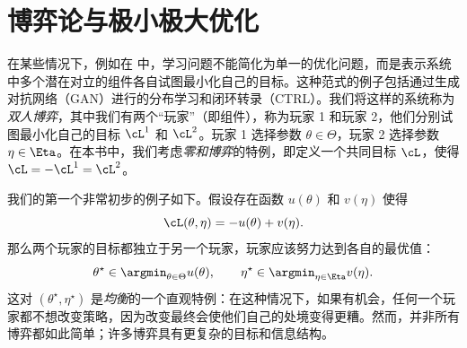 \documentclass[../../book-main_zh.tex]{subfiles}
\begin{document}
\section{博弈论与极小极大优化}
\label{sec:minimax}\label{sec:game_theory}

在某些情况下，例如在  中，学习问题不能简化为单一的优化问题，而是表示系统中多个潜在对立的组件各自试图最小化自己的目标。这种范式的例子包括通过生成对抗网络（GAN）进行的分布学习和闭环转录（CTRL）。我们将这样的系统称为\textit{双人博弈}，其中我们有两个“玩家”（即组件），称为玩家 1 和玩家 2，他们分别试图最小化自己的目标 \(\cL^{1}\) 和 \(\cL^{2}\)。玩家 1 选择参数 \(\theta \in \Theta\)，玩家 2 选择参数 \(\eta \in \Eta\)。在本书中，我们考虑\textit{零和博弈}的特例，即定义一个共同目标 \(\cL\)，使得 \(\cL = -\cL^{1} = \cL^{2}\)。

我们的第一个非常初步的例子如下。假设存在函数 \(u(\theta)\) 和 \(v(\eta)\) 使得
\begin{equation}
    \cL(\theta, \eta) = -u(\theta) + v(\eta).
\end{equation}
那么两个玩家的目标都独立于另一个玩家，玩家应该努力达到各自的最优值：
\begin{equation}
    \theta^{\star} \in \argmin_{\theta \in \Theta}u(\theta), \qquad
    \eta^{\star} \in \argmin_{\eta \in \Eta}v(\eta).
\end{equation}
这对 \((\theta^{\star}, \eta^{\star})\) 是\textit{均衡}的一个直观特例：在这种情况下，如果有机会，任何一个玩家都不想改变策略，因为改变最终会使他们自己的处境变得更糟。然而，并非所有博弈都如此简单；许多博弈具有更复杂的目标和信息结构。
\end{document}
